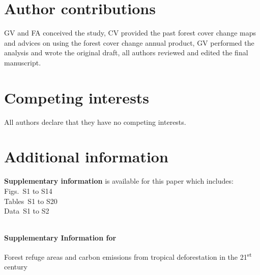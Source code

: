 \documentclass[
  12pt,
]{article}
\begin{document}
\section{Author contributions}

GV and FA conceived the study, CV provided the past forest cover change maps and advices on using the forest cover change annual product, GV performed the analysis and wrote the original draft, all authors reviewed and edited the final manuscript.

\section{Competing interests}

All authors declare that they have no competing interests.

\section{Additional information}

\textbf{Supplementary information} is available for this paper which includes:\\

\noindent Figs.~S1 to S14\\
Tables~S1 to S20\\
Data~S1 to S2\\


\nolinenumbers
\newpage
  
\renewcommand{\thetable}{S\arabic{table}}
\renewcommand{\thefigure}{S\arabic{figure}}
\renewcommand{\theequation}{S\arabic{equation}}
\setcounter{figure}{0}
\setcounter{table}{0}

\begin{center}
  ~\\%
  \vspace{0.5cm}
  \Large{\textbf{Supplementary Information for}}
\end{center}

\vspace{1cm}

\begin{center}
  \LARGE{Forest refuge areas and carbon emissions from tropical deforestation in the 21\textsuperscript{st} century}
\end{center}
\end{document}
